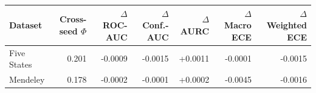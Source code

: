 \begin{tabular}{lrrrrrr}
\toprule
Dataset & Cross-seed $\Phi$ & $\Delta$ ROC-AUC & $\Delta$ Conf.-AUC & $\Delta$ AURC & $\Delta$ Macro ECE & $\Delta$ Weighted ECE \\
\midrule
Five States & 0.201 & -0.0009 & -0.0015 & +0.0011 & -0.0001 & -0.0015 \\
Mendeley & 0.178 & -0.0002 & -0.0001 & +0.0002 & -0.0045 & -0.0016 \\
\bottomrule
\end{tabular}
